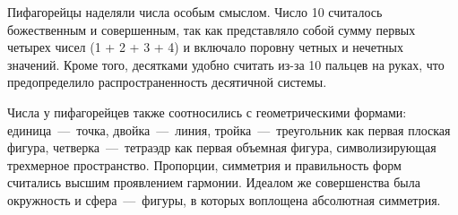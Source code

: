 
Пифагорейцы наделяли числа особым смыслом. Число 10 считалось божественным и совершенным, так как представляло собой сумму первых четырех чисел (1 + 2 + 3 + 4) и включало поровну четных и нечетных значений. Кроме того, десятками удобно считать из-за 10 пальцев на руках, что предопределило распространенность десятичной системы.

Числа у пифагорейцев также соотносились с геометрическими формами: единица~---~точка, двойка~---~линия, тройка~---~треугольник как первая плоская фигура, четверка~---~тетраэдр как первая объемная фигура, символизирующая трехмерное пространство. Пропорции, симметрия и правильность форм считались высшим проявлением гармонии. Идеалом же совершенства была окружность и сфера~---~фигуры, в которых воплощена абсолютная симметрия.

